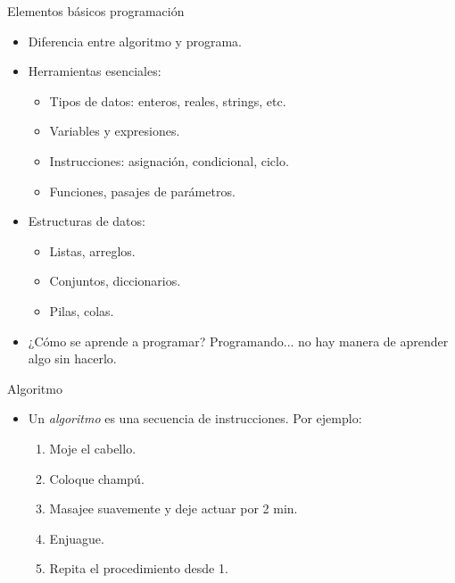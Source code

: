 \documentclass{beamer}
\begin{document}
\begin{frame}{Elementos básicos programación}
\begin{itemize}
	\item Diferencia entre algoritmo y programa.\pause
	\item Herramientas esenciales:
	\begin{itemize}
		\item Tipos de datos: enteros, reales, strings, etc.%
		\item Variables y expresiones.%
		\item Instrucciones: asignación, condicional, ciclo.%
		\item Funciones, pasajes de parámetros.
	\end{itemize}\pause
	\item Estructuras de datos:
	\begin{itemize}
		\item Listas, arreglos.
		\item Conjuntos, diccionarios.
		\item Pilas, colas.
	\end{itemize}\pause
	\item ¿Cómo se aprende a programar? \pause Programando... no hay manera de aprender algo sin hacerlo.
\end{itemize}
\end{frame}




\begin{frame}{Algoritmo}
\begin{itemize}
	\item Un \emph{algoritmo} es una secuencia de instrucciones. Por ejemplo:\pause
		\begin{enumerate}
		\item Moje el cabello. \pause
		\item Coloque champú.\pause
		\item Masajee suavemente y deje actuar por 2 min.\pause
		\item Enjuague. \pause
		\item Repita el procedimiento desde 1.
		\end{enumerate}
\end{itemize}
\end{frame}
\end{document}
